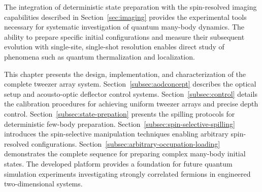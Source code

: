 The integration of deterministic state preparation with the spin-resolved imaging capabilities described in Section~\ref{sec:imaging} provides the experimental tools necessary for systematic investigation of quantum many-body dynamics. The ability to prepare specific initial configurations and measure their subsequent evolution with single-site, single-shot resolution enables direct study of phenomena such as quantum thermalization and localization. 

This chapter presents the design, implementation, and characterization of the complete tweezer array system. Section~\ref{subsec:aodconcept} describes the optical setup and acousto-optic deflector control systems. Section~\ref{subsec:control} details the calibration procedures for achieving uniform tweezer arrays and precise depth control. Section~\ref{subsec:state-prepation} presents the spilling protocols for deterministic few-body preparation. Section~\ref{subsec:spin-selective-spilling} introduces the spin-selective manipulation techniques enabling arbitrary spin-resolved configurations. Section~\ref{subsec:arbitrary-occupation-loading} demonstrates the complete sequence for preparing complex many-body initial states. The developed platform provides a foundation for future quantum simulation experiments investigating strongly correlated fermions in engineered two-dimensional systems.